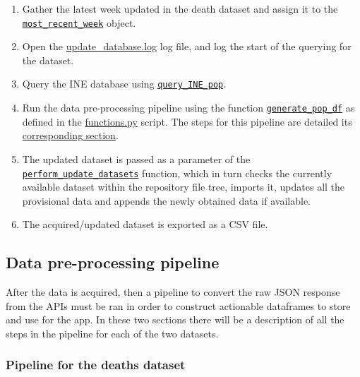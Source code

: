 \documentclass[
  a4paper]{article}
\begin{document}
\begin{enumerate}
\def\labelenumi{\arabic{enumi}.}
\item
  Gather the latest week updated in the death dataset and assign it to
  the
  \href{https://github.com/dreth/tfm_uc3m/blob/main/api/query.py\#L49}{\texttt{most\_recent\_week}}
  object.
\item
  Open the
  \href{https://github.com/dreth/tfm_uc3m/blob/main/data/logs/update_database.log}{update\_database.log}
  log file, and log the start of the querying for the dataset.
\item
  Query the INE database using
  \href{https://github.com/dreth/tfm_uc3m/blob/main/api/query.py\#L60}{\texttt{query\_INE\_pop}}.
\item
  Run the data pre-processing pipeline using the function
  \href{https://github.com/dreth/tfm_uc3m/blob/main/api/query.py\#L61}{\texttt{generate\_pop\_df}}
  as defined in the
  \href{https://github.com/dreth/tfm_uc3m/blob/report_ref/api/functions.py\#L190}{functions.py}
  script. The steps for this pipeline are detailed its
  \protect\hyperlink{PopDatasetPipeline}{corresponding section}.
\item
  The updated dataset is passed as a parameter of the
  \href{https://github.com/dreth/tfm_uc3m/blob/main/api/query.py\#L63}{\texttt{perform\_update\_datasets}}
  function, which in turn checks the currently available dataset within
  the repository file tree, imports it, updates all the provisional data
  and appends the newly obtained data if available.
\item
  The acquired/updated dataset is exported as a CSV file.
\end{enumerate}

\hypertarget{PreProcessingPipeline}{%
\subsection{Data pre-processing pipeline}\label{PreProcessingPipeline}}

After the data is acquired, then a pipeline to convert the raw JSON
response from the APIs must be ran in order to construct actionable
dataframes to store and use for the app. In these two sections there
will be a description of all the steps in the pipeline for each of the
two datasets.

\hypertarget{DeathDatasetPipeline}{%
\subsubsection{Pipeline for the deaths
dataset}\label{DeathDatasetPipeline}}
\end{document}
